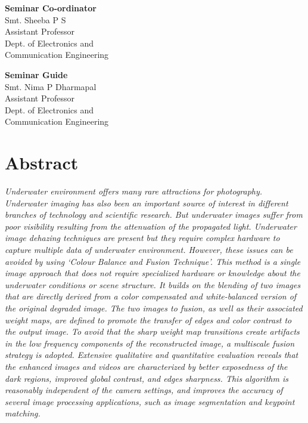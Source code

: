 \documentclass[hidelinks, 12pt]{report}
\begin{document}
\vspace{2cm}
\begin{minipage}[t]{10cm}
\flushleft \textbf{Seminar Co-ordinator}\\
Smt. Sheeba P S\\
Assistant Professor\\
Dept. of Electronics and\\
Communication Engineering
\end{minipage}
\vspace{2cm}
\begin{minipage}[t]{6cm}
\flushleft \textbf{Seminar Guide}\\
Smt. Nima P Dharmapal\\
Assistant Professor\\
Dept. of Electronics and\\
Communication Engineering
\end{minipage}

\chapter*{\centering Abstract}
\justify
\textit{
Underwater environment offers many rare attractions for photography. Underwater imaging has also been an important source of interest in different branches of technology and scientific research. But underwater images suffer from poor visibility resulting from the attenuation of the propagated light. Underwater image dehazing techniques are present but they require complex hardware to capture multiple data of underwater environment. However, these issues can be avoided by using `Colour Balance and Fusion Technique'. This method is a single image approach that does not require specialized hardware or knowledge about the underwater conditions or scene structure. It builds on the blending of two images that are directly derived from a color compensated and white-balanced version of the original degraded image. The two images to fusion, as well as their associated weight maps, are defined to promote the transfer of edges and color contrast to the output image. To avoid that the sharp weight map transitions create artifacts in the low frequency components of the reconstructed image, a multiscale fusion strategy is adopted. Extensive qualitative and quantitative evaluation reveals that the enhanced images and videos are characterized by better exposedness of the dark regions, improved global contrast, and edges sharpness. This algorithm is reasonably independent of the camera settings, and improves the accuracy of several image processing applications, such as image segmentation and keypoint matching.}\\
\end{document}
